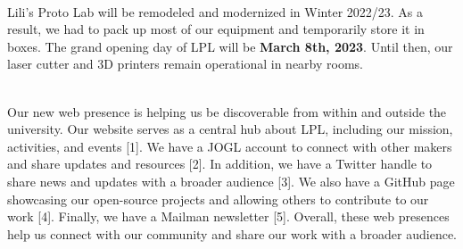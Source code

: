 \documentclass{report}
\begin{document}
 \\

Lili's Proto Lab will be remodeled and modernized in Winter 2022/23. As a result, we had to pack up most of our equipment and temporarily store it in boxes. The grand opening day of LPL will be \textbf{March 8th, 2023}. Until then, our laser cutter and 3D printers remain operational in nearby rooms. 

\clearpage
\begin{figure}
    \centering
\end{figure}
\clearpage

 \\

Our new web presence is helping us be discoverable from within and outside the university. Our website serves as a central hub about LPL, including our mission, activities, and events [1]. We have a JOGL account to connect with other makers and share updates and resources [2]. In addition, we have a Twitter handle to share news and updates with a broader audience [3]. We also have a GitHub page showcasing our open-source projects and allowing others to contribute to our work [4]. Finally, we have a Mailman newsletter [5]. Overall, these web presences help us connect with our community and share our work with a broader audience. \\
\end{document}
